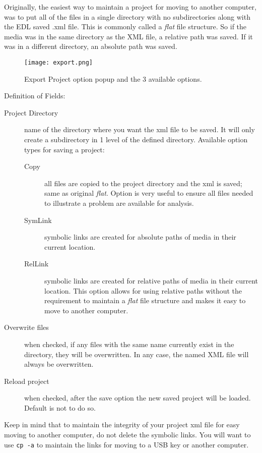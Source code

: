Originally, the easiest way to maintain a project for moving to another computer, was to put all of the files in a single directory with no subdirectories along with the EDL saved .xml file.   This is commonly called a \textit{flat} file structure.  So if the media was in the same directory as the XML file, a relative path was saved.  If it was in a different directory, an absolute path was saved.

\begin{figure}[htpb]
    \centering
    \texttt{[image: export.png]}
    \caption{Export Project option popup and the 3         available options.}
    \label{fig:export}
\end{figure}

\noindent Definition of Fields:

\begin{description}
    \item[Project Directory] name of the directory where you want the xml file to be saved.  It will only create
    a subdirectory in 1 level of the defined directory.
    Available option types for saving a project:
    \begin{description}
        \item[Copy] all files are copied to the project directory and the xml is saved; same as original \textit{flat}.
        Option is very useful to ensure all files needed to illustrate a problem are available for analysis.
        \item[SymLink] symbolic links are created for absolute paths of media in their current location.
        \item[RelLink] symbolic links are created for relative paths of media in their current location.  This
        option allows for using relative paths without the requirement to maintain a \textit{flat} file structure
        and makes it easy to move to another computer.
    \end{description}
    \item[Overwrite files] when checked, if any files with the same name currently exist in the directory, they
    will be overwritten.  In any case, the named XML file will always be overwritten.
    \item[Reload project] when checked, after the save option the new saved project will be loaded. Default is not to do so.
\end{description}

\noindent Keep in mind that to maintain the integrity of your project xml file for easy moving to another computer, do not delete the symbolic links.  You will want to use \texttt{cp\,-a} to maintain the links for moving to a USB key or another computer.

